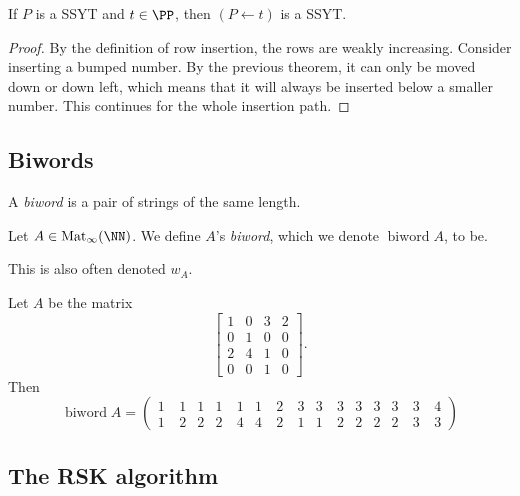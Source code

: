 \documentclass{article}
\DeclareMathOperator{\Mat}{Mat}
\DeclareMathOperator{\biword}{biword}
\begin{document}
\begin{corollary}\label{InsertionPreservesSSYT}
    If $P$ is a SSYT and $t \in \PP$, then $(P \leftarrow t)$ is a SSYT.
\end{corollary}

\begin{proof}
    By the definition of row insertion, the rows are weakly increasing. Consider inserting a bumped number. By the previous theorem, it can only be moved down or down left, which means that it will always be inserted below a smaller number. This continues for the whole insertion path.
\end{proof}

\subsection{Biwords}

\begin{definition}
    A \textit{biword} is a pair of strings of the same length.
\end{definition}

\begin{definition}
    Let $A \in \Mat_\infty(\NN)$.
    We define $A$'s \textit{biword}, which we denote $\biword A$, to be.

    This is also often denoted $w_A$.
\end{definition}

\begin{example}
    Let $A$ be the matrix
    \[
        \begin{bmatrix}
            1 & 0 & 3 & 2 \\
            0 & 1 & 0 & 0 \\
            2 & 4 & 1 & 0 \\
            0 & 0 & 1 & 0
        \end{bmatrix}.
    \]
    Then 
    \[
        \biword A = \begin{pmatrix}
            1 & 1 & 1 & 1 & 1 & 1 \
              & 2 \
              & 3 & 3 & 3 & 3 & 3 & 3 & 3\
              & 4 \\
            1 \
              & 2 & 2 & 2 \
              & 4 & 4 \
              & 2 \
              & 1 & 1 \
              & 2 & 2 & 2 & 2 \
              & 3 \
              & 3
        \end{pmatrix}
    \]
\end{example}

\subsection{The RSK algorithm}
\end{document}

